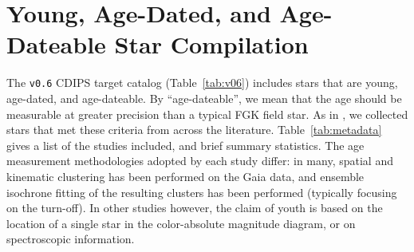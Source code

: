 \documentclass[12pt,modern,twocolumn,tighten]{aastex63}
\begin{document}







\clearpage
                            
 

\appendix
\section{Young, Age-Dated, and Age-Dateable Star Compilation}
\label{app:targetlist}


The \texttt{v0.6} CDIPS target catalog (Table~\ref{tab:v06}) includes
stars that are young, age-dated, and age-dateable.  By ``age-dateable'',
we mean that the age should be measurable at greater
precision than a typical FGK field star.
As in
\citet{bouma_cdipsI_2019}, we collected stars that met these criteria
from across the literature.  Table~\ref{tab:metadata} gives a list of
the studies included, and brief summary statistics.
The age measurement methodologies adopted by each study differ: in many,
spatial and kinematic clustering has been performed on the Gaia data,
and ensemble isochrone fitting of the resulting clusters has been performed
(typically focusing on the turn-off).
In other studies however, the claim of youth is based on the location of a
single star in the color-absolute magnitude diagram, or on spectroscopic
information.
\end{document}
